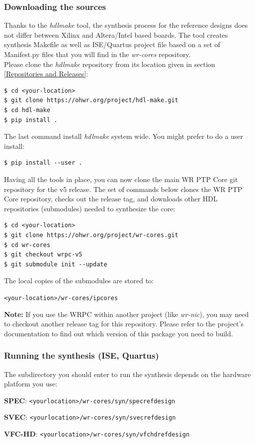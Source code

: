 \documentclass[a4paper, 12pt]{article}
\renewcommand{\_}{\underscore\allowbreak}
\begin{document}
\subsubsection{Downloading the sources}
Thanks to the \textit{hdlmake} tool, the synthesis process for the reference
designs does not differ between Xilinx and Altera/Intel based boards. The tool creates
synthesis Makefile as well as ISE/Quartus project file based on a set of
Manifest.py files that you will find in the \textit{wr-cores} repository.\\

Please clone the \textit{hdlmake} repository from its location given in
section \ref{Repositories and Releases}:
\begin{lstlisting}
$ cd <your-location>
$ git clone https://ohwr.org/project/hdl-make.git
$ cd hdl-make
$ pip install .
\end{lstlisting}

The last command install \textit{hdlmake} system wide.  You might prefer
to do a user install:
\begin{lstlisting}
$ pip install --user .
\end{lstlisting}

Having all the tools in place, you can now clone the main WR PTP Core git
repository for the v5 release. The set of commands below clones the WR PTP Core
repository, checks out the release tag, and downloads other HDL repositories
(submodules) needed to synthesize the core:
\begin{lstlisting}
$ cd <your-location>
$ git clone https://ohwr.org/project/wr-cores.git
$ cd wr-cores
$ git checkout wrpc-v5
$ git submodule init --update
\end{lstlisting}

The local copies of the submodules are stored to:

\texttt{<your-location>/wr-cores/ip\_cores}

\vspace{1em}
\textbf{Note:} If you use the WRPC within another project (like
\textit{wr-nic}), you may need to checkout another release tag for this
repository. Please refer to the project's documentation to find out which
version of this package you need to build.

\subsubsection{Running the synthesis (ISE, Quartus)}
The subdirectory you should enter to run the synthesis depends on the hardware
platform you use:
\begin{itemize*}
  \item \textbf{SPEC}: \texttt{<your\_location>/wr-cores/syn/spec\_ref\_design}
  \item \textbf{SVEC}: \texttt{<your\_location>/wr-cores/syn/svec\_ref\_design}
  \item \textbf{VFC-HD}: \texttt{<your\_location>/wr-cores/syn/vfchd\_ref\_design}
\end{itemize*}
\end{document}
